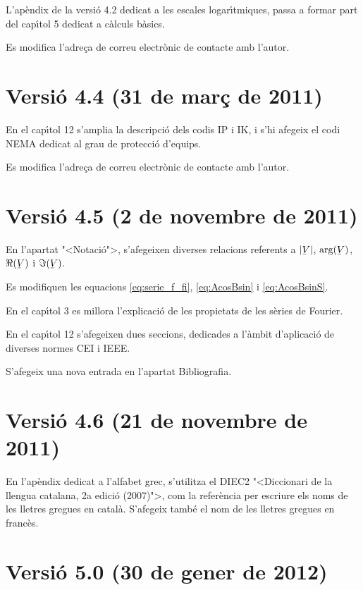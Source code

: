 L'ap\`{e}ndix de la versi\'{o} 4.2 dedicat a les escales logar\'{\i}tmiques, passa a formar part del cap\'{\i}tol 5 dedicat a c\`{a}lculs b\`{a}sics.

Es modifica l'adre\c{c}a de correu electr\`{o}nic de contacte amb l'autor.

\section*{Versi\'{o} 4.4 (31 de mar\c{c} de 2011)}
En el cap\'{\i}tol 12 s'amplia la descripci\'{o} dels codis IP i IK, i s'hi afegeix el codi NEMA dedicat al grau de protecci\'{o} d'equips.

Es modifica l'adre\c{c}a de correu electr\`{o}nic de contacte amb l'autor.

\section*{Versi\'{o} 4.5 (2 de novembre de 2011)}
En l'apartat {"<}Notaci\'{o}{">}, s'afegeixen diverses relacions referents a $|\cmplx{V}|$, $\arg(\cmplx{V})$, $\Re(\cmplx{V})$ i $\Im(\cmplx{V})$.

Es modifiquen les equacions \eqref{eq:serie_f_fi}, \eqref{eq:AcosBsin} i \eqref{eq:AcosBsinS}.

En el cap\'{\i}tol 3 es millora l'explicaci\'{o} de les propietats de les s\`{e}ries de Fourier.

En el cap\'{\i}tol 12 s'afegeixen dues seccions, dedicades a l'\`{a}mbit d'aplicaci\'{o} de diverses normes \textsf{CEI} i \textsf{IEEE}.

S'afegeix una nova entrada en l'apartat Bibliografia.


\section*{Versi\'{o} 4.6 (21 de novembre de 2011)}

En l'ap\`{e}ndix dedicat a l'alfabet grec, s'utilitza el DIEC2 {"<}Diccionari de la llengua catalana, 2a edici\'{o} (2007){">}, com la refer\`{e}ncia per escriure els noms de les lletres gregues en catal\`{a}. S'afegeix tamb\'{e} el nom de les lletres gregues en franc\`{e}s.


\section*{Versi\'{o} 5.0 (30 de gener de 2012)}

